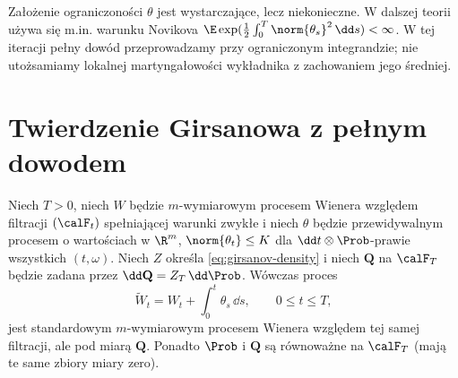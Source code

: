 \begin{uwaga}
Założenie ograniczoności $\theta$ jest wystarczające,
lecz niekonieczne. W dalszej teorii używa się m.in.
warunku Novikova
$\E\exp(\frac12\int_0^T\norm{\theta_s}^2\,\dd s)<\infty$.
W tej iteracji pełny dowód przeprowadzamy przy
ograniczonym integrandzie; nie utożsamiamy lokalnej
martyngałowości wykładnika z zachowaniem jego średniej.
\end{uwaga}

\section{Twierdzenie Girsanowa z pełnym dowodem}

\begin{twierdzenie}
\label{th:girsanov-bounded}
Niech $T>0$, niech $W$ będzie $m$-wymiarowym
procesem Wienera względem filtracji $(\calF_t)$
spełniającej warunki zwykłe i niech $\theta$ będzie
przewidywalnym procesem o wartościach w $\R^m$,
$\norm{\theta_t}\le K$ dla $\dd t\otimes\Prob$-prawie
wszystkich $(t,\omega)$. Niech $Z$ określa
\eqref{eq:girsanov-density} i niech $\mathbf Q$ na
$\calF_T$ będzie zadana przez $\dd\mathbf Q=Z_T\,\dd\Prob$.
Wówczas proces
\[
\widetilde W_t=W_t+\int_0^t\theta_s\,\dd s,
\qquad 0\le t\le T,
\tag{8.5}\label{eq:shifted-wiener}
\]
jest standardowym $m$-wymiarowym procesem Wienera
względem tej samej filtracji, ale pod miarą $\mathbf Q$.
Ponadto $\Prob$ i $\mathbf Q$ są równoważne na
$\calF_T$ (mają te same zbiory miary zero).
\end{twierdzenie}
